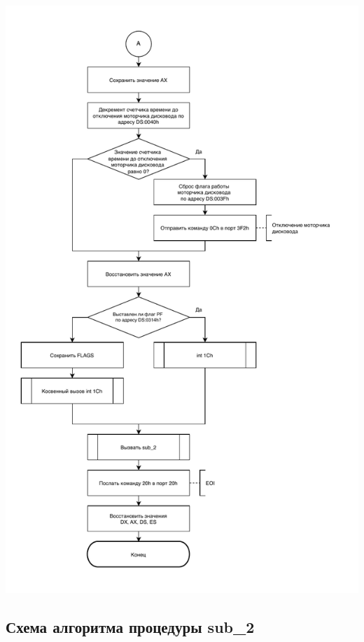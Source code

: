 \documentclass[a4paper,14pt]{article}
\begin{document}
\begin{flushright}
\begin{center}
	\includegraphics[height=0.98\textheight]{assets/int8h_part2.pdf}
	\end{center}
\end{flushright}

\newpage

\subsection{Схема алгоритма процедуры sub\_2}
\end{document}
